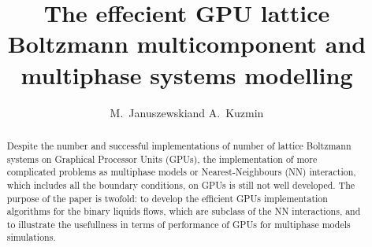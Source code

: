 \documentclass[mathpazo]{cicp}
\begin{document}
\title{The effecient GPU lattice Boltzmann multicomponent and multiphase systems modelling}

\author[M.~Januszewski and A.~Kuzmin]{M.~Januszewski\corrauth and A.~Kuzmin}
\address{\ Institute of Physics, University of Silesia, Katowice, Poland\\
\ Department of Mechanical and Manufacturing Engineering,
Schulich School of Engineering,
University of Calgary, Canada
}



\begin{abstract}
Despite the number and successful implementations of number of lattice Boltzmann systems on Graphical Processor Units (GPUs), the implementation of more complicated problems as multiphase models or Nearest-Neighbours (NN) interaction, which includes all the boundary conditions, on GPUs is still not well developed. The purpose of the paper is twofold: to develop the efficient GPUs implementation algorithms for the binary liquids flows, which are subclass of the NN interactions, and to illustrate the usefullness in terms of performance of GPUs for multiphase models simulations.
\end{abstract}
\end{document}
